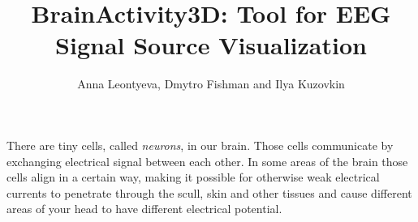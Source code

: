 \documentclass[twocolumn]{article}
\begin{document}
%
%
\title{BrainActivity3D: Tool for EEG Signal Source Visualization}
\author{Anna Leontyeva, Dmytro Fishman and Ilya Kuzovkin} 

%
%

%
%

There are tiny cells, called \emph{neurons}, in our brain. Those cells communicate by exchanging electrical signal between each other. In some areas of the brain those cells align in a certain way, making it possible for otherwise weak electrical currents to penetrate through the scull, skin and other tissues and cause different areas of your head to have different electrical potential. 
\end{document}
